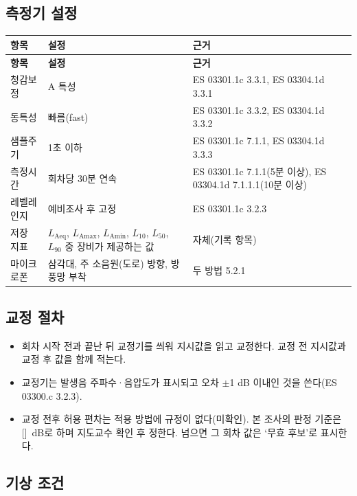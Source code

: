 \documentclass[10.5pt,a4paper]{article}
\newcommand{\Laeq}{\ensuremath{L_{\mathrm{Aeq}}}}
\newcommand{\IN}{[\quad]}
\newcommand{\hd}[1]{\cellcolor{headfill}\textbf{\sffamily #1}}
\begin{document}
\subsection{측정기 설정}
\footnotesize
\begin{longtable}{>{\raggedright\arraybackslash}p{}>{\raggedright\arraybackslash}p{}>{\raggedright\arraybackslash}p{}}
\toprule
\hd{항목} & \hd{설정} & \hd{근거} \\ \midrule
\endfirsthead
\toprule
\hd{항목} & \hd{설정} & \hd{근거} \\ \midrule
\endhead
\bottomrule
\endlastfoot
청감보정 & A 특성 & ES 03301.1c 3.3.1, ES 03304.1d 3.3.1 \\ \midrule
동특성 & 빠름(fast) & ES 03301.1c 3.3.2, ES 03304.1d 3.3.2 \\ \midrule
샘플주기 & 1초 이하 & ES 03301.1c 7.1.1, ES 03304.1d 3.3.3 \\ \midrule
측정시간 & 회차당 30분 연속 & ES 03301.1c 7.1.1(5분 이상), ES 03304.1d 7.1.1.1(10분 이상) \\ \midrule
레벨레인지 & 예비조사 후 고정 & ES 03301.1c 3.2.3 \\ \midrule
저장 지표 & \Laeq, $L_{\mathrm{Amax}}$, $L_{\mathrm{Amin}}$, $L_{10}$, $L_{50}$, $L_{90}$ 중 장비가 제공하는 값 & 자체(기록 항목) \\ \midrule
마이크로폰 & 삼각대, 주 소음원(도로) 방향, 방풍망 부착 & 두 방법 5.2.1 \\
\end{longtable}
\addtocounter{table}{-1}
\normalsize
{}\subsection{교정 절차}
\begin{itemize}
\item 회차 시작 전과 끝난 뒤 교정기를 씌워 지시값을 읽고 교정한다. 교정 전 지시값과 교정 후 값을 함께 적는다.
\item 교정기는 발생음 주파수·음압도가 표시되고 오차 $\pm$1 dB 이내인 것을 쓴다(ES 03300.c 3.2.3).
\item 교정 전후 허용 편차는 적용 방법에 규정이 없다(미확인). 본 조사의 판정 기준은 \IN\ dB로 하며 지도교수 확인 후 정한다. 넘으면 그 회차 값은 `무효 후보'로 표시한다.
\end{itemize}
\subsection{기상 조건}
\end{document}
